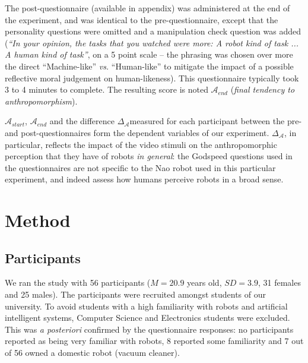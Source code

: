 \documentclass[lettersize, noapacite, twoside, HRI]{apa_HRI}
\newcommand{\vs}{\textit{vs.}\xspace}
\newcommand{\anti}{{$\mathcal{A}_{start}$\xspace}}
\newcommand{\antf}{{$\mathcal{A}_{end}$\xspace}}
\newcommand{\deltaant}{{$\Delta_{\mathcal{A}}$\xspace}}
\begin{document}
The post-questionnaire (available in appendix) was administered at the end of the experiment, and was
identical to the pre-questionnaire, except that the personality questions were omitted and a
manipulation check question was added (\emph{``In your opinion, the tasks that
you watched were more: A robot kind of task ... A human kind of task''}, on a 5
point scale -- the phrasing was chosen over more the direct ``Machine-like'' \vs
``Human-like'' to mitigate the impact of a possible reflective moral judgement
on human-likeness).
This questionnaire typically took 3 to 4 minutes to complete. The resulting score is
noted \antf{} (\emph{final tendency to anthropomorphism}).

\anti{}, \antf{} and the difference \deltaant measured for each participant between
the pre- and post-questionnaires form the dependent variables of our experiment.
\deltaant, in particular, reflects the impact of the video stimuli on the
anthropomorphic perception that they have of robots \emph{in general}: the
Godspeed questions used in the questionnaires are not specific to the Nao robot
used in this particular experiment, and indeed assess how humans perceive robots
in a broad sense.

\section{Method}


%
%
%
%

\subsection{Participants}

We ran the study with 56 participants ($M = 20.9$ years old, $SD = 3.9$, 31 females and
25 males).  The participants were recruited amongst students of our university.
To avoid students with a high familiarity with robots and artificial intelligent
systems, Computer Science and Electronics students were excluded. This was
\textit{a posteriori} confirmed by the questionnaire responses: no participants
reported as being very familiar with robots, 8 reported some familiarity
and 7 out of 56 owned a domestic robot (vacuum cleaner).
\end{document}

